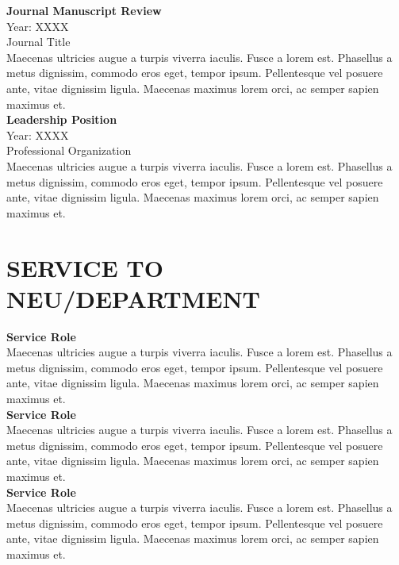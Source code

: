 \documentclass[a4paper,9pt]{extarticle}
\begin{document}
\noindent
\newline
\textbf{Journal Manuscript Review} \\
Year: XXXX \\
Journal Title \\
Maecenas ultricies augue a turpis viverra iaculis. Fusce a lorem est. Phasellus a metus dignissim, commodo eros eget, tempor ipsum. Pellentesque vel posuere ante, vitae dignissim ligula. Maecenas maximus lorem orci, ac semper sapien maximus et. \\

\noindent
\textbf{Leadership Position} \\
Year: XXXX \\
Professional Organization \\
Maecenas ultricies augue a turpis viverra iaculis. Fusce a lorem est. Phasellus a metus dignissim, commodo eros eget, tempor ipsum. Pellentesque vel posuere ante, vitae dignissim ligula. Maecenas maximus lorem orci, ac semper sapien maximus et. 


\section*{SERVICE TO NEU/DEPARTMENT}

\noindent
\newline
\textbf{Service Role} \\
Maecenas ultricies augue a turpis viverra iaculis. Fusce a lorem est. Phasellus a metus dignissim, commodo eros eget, tempor ipsum. Pellentesque vel posuere ante, vitae dignissim ligula. Maecenas maximus lorem orci, ac semper sapien maximus et. \\

\noindent
\textbf{Service Role} \\
Maecenas ultricies augue a turpis viverra iaculis. Fusce a lorem est. Phasellus a metus dignissim, commodo eros eget, tempor ipsum. Pellentesque vel posuere ante, vitae dignissim ligula. Maecenas maximus lorem orci, ac semper sapien maximus et. \\

\noindent
\textbf{Service Role} \\
Maecenas ultricies augue a turpis viverra iaculis. Fusce a lorem est. Phasellus a metus dignissim, commodo eros eget, tempor ipsum. Pellentesque vel posuere ante, vitae dignissim ligula. Maecenas maximus lorem orci, ac semper sapien maximus et. 
\end{document}
